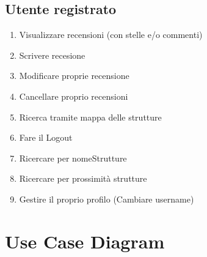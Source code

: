 \documentclass{article}
\begin{document}
 \subsection{Utente registrato} 
 \begin{enumerate}
    \item Visualizzare recensioni (con stelle e/o commenti)
    \item Scrivere recesione
    \item Modificare proprie recensione
    \item Cancellare proprio recensioni
    \item Ricerca tramite mappa delle strutture
    \item Fare il Logout
    \item Ricercare per nomeStrutture 
    \item Ricercare per prossimità strutture 
    \item Gestire il proprio profilo (Cambiare username)
 \end{enumerate}

 \section{Use Case Diagram}
 
 
 
\end{document}
